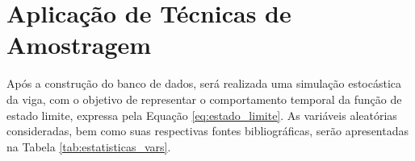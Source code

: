 

\section{Aplicação de Técnicas de Amostragem }

Após a construção do banco de dados, será realizada uma simulação estocástica da viga, com o objetivo de representar o comportamento temporal da função de estado limite, expressa pela Equação \eqref{eq:estado_limite}. As variáveis aleatórias consideradas, bem como suas respectivas fontes bibliográficas, serão apresentadas na Tabela \ref{tab:estatisticas_vars}. 

